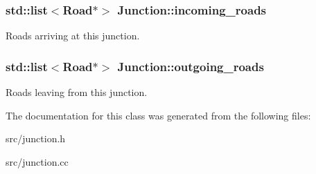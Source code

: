 \subsubsection{\setlength{\rightskip}{0pt plus 5cm}std::list$<${\bf Road}$\ast$$>$ {\bf Junction::incoming\_\-roads}}\label{classJunction_Junctiono0}


Roads arriving at this junction. 

\subsubsection{\setlength{\rightskip}{0pt plus 5cm}std::list$<${\bf Road}$\ast$$>$ {\bf Junction::outgoing\_\-roads}}\label{classJunction_Junctiono1}


Roads leaving from this junction. 



The documentation for this class was generated from the following files:\begin{CompactItemize}
\item 
src/junction.h\item 
src/junction.cc\end{CompactItemize}
